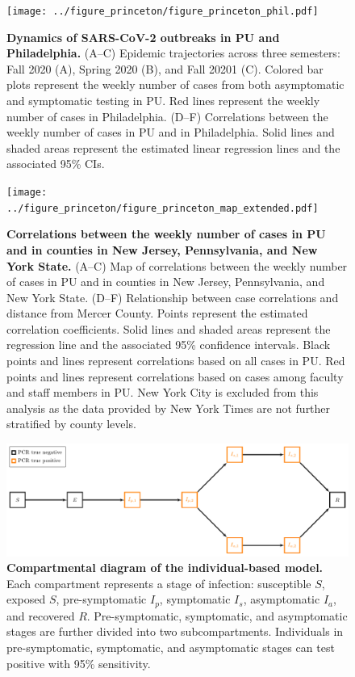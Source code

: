 \documentclass[12pt]{article}
\begin{document}
\pagebreak

\begin{figure}[!htp]
\texttt{[image: ../figure\_princeton/figure\_princeton\_phil.pdf]}
\caption{
\textbf{Dynamics of SARS-CoV-2 outbreaks in PU and Philadelphia.}
(A--C) Epidemic trajectories across three semesters: Fall 2020 (A), Spring 2020 (B), and Fall 20201 (C).
Colored bar plots represent the weekly number of cases from both asymptomatic and symptomatic testing in PU.
Red lines represent the weekly number of cases in Philadelphia.
(D--F) Correlations between the weekly number of cases in PU and in Philadelphia.
Solid lines and shaded areas represent the estimated linear regression lines and the associated 95\% CIs.
}
\end{figure}

\pagebreak

\begin{figure}[!htp]
\texttt{[image: ../figure\_princeton/figure\_princeton\_map\_extended.pdf]}
\caption{
\textbf{Correlations between the weekly number of cases in PU and in counties in New Jersey, Pennsylvania, and New York State.}
(A--C) Map of correlations between the weekly number of cases in PU and in counties in New Jersey, Pennsylvania, and New York State.
(D--F) Relationship between case correlations and distance from Mercer County.
Points represent the estimated correlation coefficients.
Solid lines and shaded areas represent the regression line and the associated 95\% confidence intervals.
Black points and lines represent correlations based on all cases in PU.
Red points and lines represent correlations based on cases among faculty and staff members in PU.
New York City is excluded from this analysis as the data provided by New York Times are not further stratified by county levels.
}
\end{figure}


\pagebreak

\begin{figure}[!htp]
\includegraphics[width=\textwidth]{../figure_diagram/diagram.pdf}
\caption{
\textbf{Compartmental diagram of the individual-based model.}
Each compartment represents a stage of infection: susceptible $S$, exposed $S$, pre-symptomatic $I_p$, symptomatic $I_s$, asymptomatic $I_a$, and recovered $R$.
Pre-symptomatic, symptomatic, and asymptomatic stages are further divided into two subcompartments.
Individuals in pre-symptomatic, symptomatic, and asymptomatic stages can test positive with 95\% sensitivity.
}
\end{figure}
\end{document}

